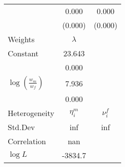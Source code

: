 \begin{tabular}{lcc}
 & 0.000 & 0.000 \\ 
 & (0.000) & (0.000) \\ 
Weights & $\lambda$ &  \\ 
Constant & 23.643 &  \\ 
 & 0.000 &  \\ 
$\log(\frac{w_m}{w_f})$ & 7.936 &  \\ 
 & 0.000 &  \\ 
Heterogeneity & $\eta_i^m$ & $\nu_i^f$ \\ 
Std.Dev & inf & inf \\ 
Correlation & nan &  \\ 
\hline 
$\log L$ & -3834.7 & \\ 
\hline \hline 
\end{tabular} 
